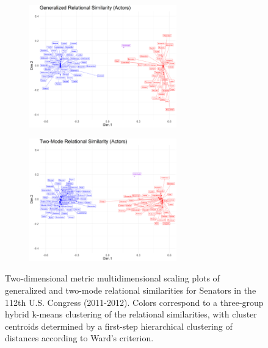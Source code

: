 \documentclass[a4paper,fleqn]{cas-sc}
\begin{document}
\begin{figure}[ht!]
     \begin{subfigure}[b]{1.0\textwidth}
        \centering
        \includegraphics[width=0.7\textwidth]{Plots/grs-actors-sb.png}
        \caption{}
        \label{fig:grs-actors-sb}
    \end{subfigure} 
     \begin{subfigure}[b]{1.0\textwidth}
        \centering
        \includegraphics[width=0.7\textwidth]{Plots/tmrs-actors-sb.png}
        \caption{}
        \label{fig:tmrs-actors-sb}
    \end{subfigure} 
    \caption{Two-dimensional metric multidimensional scaling plots of generalized and two-mode relational similarities for Senators in the 112th U.S. Congress (2011-2012). Colors correspond to a three-group hybrid k-means clustering of the relational similarities, with cluster centroids determined by a first-step hierarchical clustering of distances according to Ward's \citeyearpar{ward63} criterion.}
    \label{fig:actors-sb}
 \end{figure}
\end{document}
